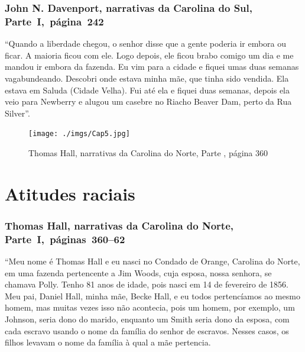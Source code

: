 \subsection{John N. Davenport, narrativas da Carolina do Sul, Parte~I,~página~242} \label{ref66}

``Quando a liberdade chegou, o senhor disse que a gente poderia ir
embora ou ficar. A maioria ficou com ele. Logo depois, ele ficou brabo
comigo um dia e me mandou ir embora da fazenda. Eu vim para a cidade e
fiquei umas duas semanas vagabundeando. Descobri onde estava minha mãe,
que tinha sido vendida. Ela estava em Saluda (Cidade Velha). Fui até ela
e fiquei duas semanas, depois ela veio para Newberry e alugou um casebre
no Riacho Beaver Dam, perto da Rua Silver''.


\pagebreak
\thispagestyle{empty}
\movetoevenpage
\thispagestyle{empty}

\begin{absolutelynopagebreak}
\begin{vplace}
\begin{figure}[H]
\begin{adjustwidth}{-1.8cm}{}
  \vspace*{-2cm}
  \texttt{[image: ./imgs/Cap5.jpg]}  
\end{adjustwidth}
  \caption{Thomas Hall, narrativas da Carolina do Norte, Parte , página 360}
\end{figure}
\end{vplace}

\end{absolutelynopagebreak}

\chapter{Atitudes raciais}

\subsection{Thomas Hall, narrativas da Carolina do Norte, Parte~I,~páginas~360--62}
\label{ref118}

``Meu nome é Thomas Hall e eu nasci no Condado de Orange, Carolina do
Norte, em uma fazenda pertencente a Jim Woods, cuja esposa, nossa
senhora, se chamava Polly. Tenho 81 anos de idade, pois nasci em 14 de
fevereiro de 1856. Meu pai, Daniel Hall, minha mãe, Becke Hall, e eu
todos pertencíamos ao mesmo homem, mas muitas vezes isso não acontecia,
pois um homem, por exemplo, um Johnson, seria dono do marido, enquanto
um Smith seria dono da esposa, com cada escravo usando o nome da família
do senhor de escravos. Nesses casos, os filhos levavam o nome da família
à qual a mãe pertencia.

